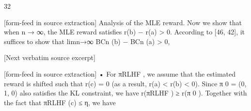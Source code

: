\documentclass[10pt]{article}
\begin{document}
\begin{ReviewVerbatim}
                                                              32

[form-feed in source extraction]
Analysis of the MLE reward. Now we show that when n → ∞, the MLE reward satisfies
r(b) − r(a) > 0. According to [46, 42], it suffices to show that limn→∞ BCn (b) − BCn (a) > 0,

[Next verbatim source excerpt]


[form-feed in source extraction]
       • For πRLHF , we assume that the estimated reward is shifted such that r(c) = 0 (as a result,
         r(a) < r(b) < 0). Since π 0 = (0, 1, 0) also satisfies the KL constraint, we have r(πRLHF ) ≥
         r(π 0 ). Together with the fact that πRLHF (c) ≤ η, we have
\end{ReviewVerbatim}
\end{document}
